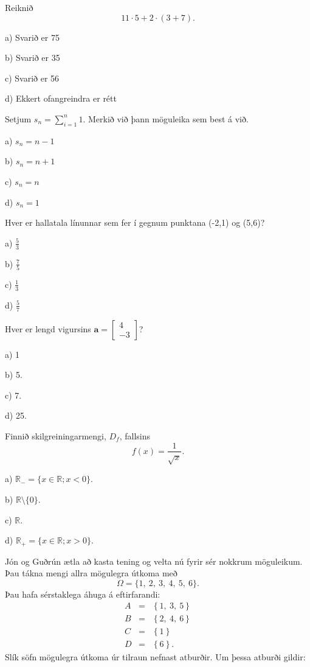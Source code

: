 \item Reiknið
$$
11 \cdot 5+2 \cdot  \left ( 3+7 \right ) .
$$
\newpage

a) Svarið er 75 %

b) Svarið er 35

c) Svarið er 56

d) Ekkert ofangreindra er rétt


\item Setjum $s_n = \sum_{i=1}^n 1$. Merkið við þann möguleika sem best á við.
\newpage

a) $s_n = n-1$

b) $s_n = n+1$

c) $s_n = n$ %

d) $s_n = 1$


\item Hver er hallatala línunnar sem fer í gegnum punktana (-2,1) og (5,6)?

a) \hspace{2mm} $\displaystyle\frac{5}{3}$

b) \hspace{2mm} $\displaystyle\frac{7}{5}$

c) \hspace{2mm} $\displaystyle\frac{1}{3}$

d) \hspace{2mm} $\displaystyle\frac{5}{7}$ %


\item Hver er lengd vigursins $ \mathbf{a} =
\left[
\begin{matrix}
4\\
-3
\end{matrix}
\right]$?

a) 1

b) 5. %

c) 7.

d) 25.


\item Finnið skilgreiningarmengi, $D_f$, fallsins $$f(x) = \frac{1}{\sqrt x}.$$

a) $\mathbb{R}_- = \{ x \in \mathbb{R} ; x<0\}$.

b) $\mathbb{R} \setminus \{0\}$.

c) $\mathbb{R}$.

d) $\mathbb{R}_+ = \{ x \in \mathbb{R} ; x>0\}$. %


\item Jón og Guðrún ætla að kasta tening og velta nú fyrir sér nokkrum möguleikum. Þau tákna mengi
allra mögulegra útkoma með
$$
\Omega=\{1,\ 2,\ 3,\ 4,\ 5,\ 6\}.
$$
Þau hafa sérstaklega áhuga á eftirfarandi:
\begin{eqnarray*}
A&=&\left \{ 1,\ 3,\ 5 \right \} \\
B&=&\left \{ 2,\ 4,\ 6  \right \} \\
C&=&\left \{ 1 \right \} \\
D&=&\left \{ 6 \right \}.
\end{eqnarray*}
Slík söfn mögulegra útkoma úr tilraun nefnast atburðir. Um þessa atburði gildir:

